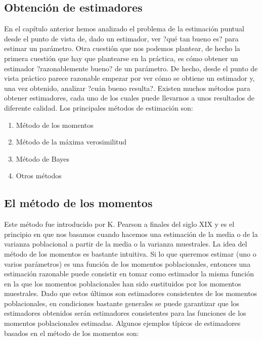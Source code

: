 \documentclass[
]{article}
\providecommand{\tightlist}{%
  \setlength{\itemsep}{0pt}\setlength{\parskip}{0pt}}
\begin{document}
\subsection{Obtención de estimadores}\label{obtenciuxf3n-de-estimadores}

En el capítulo anterior hemos analizado el problema de la estimación puntual desde el punto de vista de, dado un estimador, ver ?qué tan bueno es? para estimar un parámetro.
Otra cuestión que nos podemos plantear, de hecho la primera cuestión que hay que plantearse en la práctica, es cómo obtener un estimador ?razonablemente bueno? de un parámetro. De hecho, desde el punto de vista práctico parece razonable empezar por ver cómo se obtiene un estimador y, una vez obtenido, analizar ?cuán bueno resulta?.
Existen muchos métodos para obtener estimadores, cada uno de los cuales puede llevarnos a unos resultados de diferente calidad.
Los principales métodos de estimación son:

\begin{enumerate}
\def\labelenumi{\arabic{enumi}.}
\tightlist
\item
  Método de los momentos
\item
  Método de la máxima verosimilitud
\item
  Método de Bayes
\item
  Otros métodos
\end{enumerate}

\subsection{El método de los momentos}\label{el-muxe9todo-de-los-momentos}

Este método fue introducido por K. Pearson a finales del siglo XIX y es el principio en que nos basamos cuando hacemos una estimación de la media o de la varianza poblacional a partir de la media o la varianza muestrales.
La idea del método de los momentos es bastante intuitiva. Si lo que queremos estimar (uno o varios parámetros) es una función de los momentos
poblacionales, entonces una estimación razonable puede consistir en tomar como estimador la misma función en la que los momentos poblacionales han sido sustituidos por los momentos muestrales.
Dado que estos últimos son estimadores consistentes de los momentos poblacionales, en condiciones bastante generales se puede garantizar que los estimadores obtenidos serán estimadores consistentes para las funciones de los momentos poblacionales estimadas.
Algunos ejemplos típicos de estimadores basados en el método de los momentos son:
\end{document}
